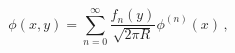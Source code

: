 \begin{equation}
\phi(x,y)=\sum_{n=0}^\infty \frac{f_n(y)}{\sqrt{2\pi R}}
\phi^{(n)}(x) \, , \label{scalarKKexpansion}
\end{equation}

